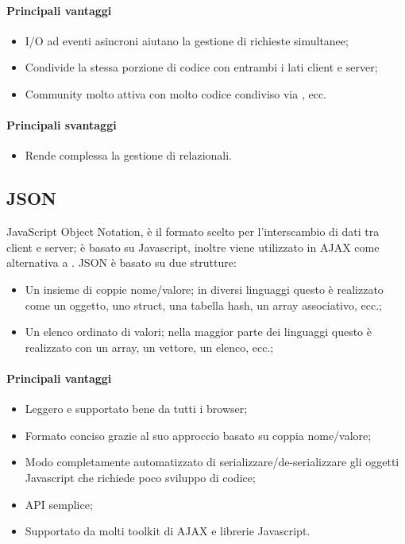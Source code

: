 \documentclass[../PianoDiQualifica.tex]{subfiles}
\begin{document}
			\paragraph{Principali vantaggi}
			\begin{itemize}
					\item I/O ad eventi asincroni aiutano la gestione di richieste simultanee;
					\item Condivide la stessa porzione di codice con entrambi i lati client e server;
					\item Community molto attiva con molto codice condiviso via , ecc.
				\end{itemize}
			\paragraph{Principali svantaggi}
				\begin{itemize}
					\item Rende complessa la gestione di  relazionali.
				\end{itemize}
		\subsection{JSON}
			JavaScript Object Notation, è il formato scelto per l'interscambio di dati tra client e
			server; è basato su Javascript, inoltre viene utilizzato in AJAX come
			alternativa a . JSON è basato su due strutture:
			\begin{itemize}
				\item Un insieme di coppie nome/valore; in diversi linguaggi questo è realizzato come
				un oggetto, uno struct, una tabella hash, un array associativo, ecc.;
				\item Un elenco ordinato di valori; nella maggior parte dei linguaggi questo è
				realizzato con un array, un vettore, un elenco, ecc.;
			\end{itemize}
			\paragraph{Principali vantaggi}
			\begin{itemize}
					\item Leggero e supportato bene da tutti i browser;
					\item Formato conciso grazie al suo approccio basato su coppia nome/valore;
					\item Modo completamente automatizzato di serializzare/de-serializzare gli oggetti
					Javascript che richiede poco sviluppo di codice;
					\item API semplice;
					\item Supportato da molti toolkit di AJAX e librerie Javascript.
				\end{itemize}
\end{document}
